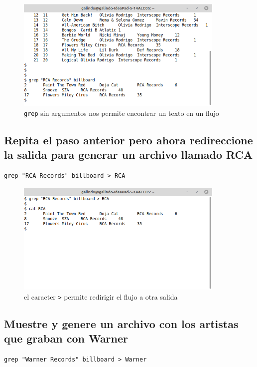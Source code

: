 \documentclass[11pt]{article}
\begin{document}
\begin{figure}[htbp]
\centering
\includegraphics[width=10cm]{img/2.png}
\caption[\texttt{grep}]{\texttt{grep} sin argumentos nos permite encontrar un texto en un flujo}
\end{figure}

\pagebreak

\subsection{Repita el paso anterior pero ahora redireccione la salida para generar un archivo llamado RCA}
\label{sec:orgbe7fde3}

\begin{verbatim}
grep "RCA Records" billboard > RCA
\end{verbatim}

\begin{figure}[htbp]
\centering
\includegraphics[width=10cm]{img/3.png}
\caption[\texttt{>}]{el caracter \texttt{>} permite redirigir el flujo a otra salida}
\end{figure}


\subsection{Muestre y genere un archivo con los artistas que graban con Warner}
\label{sec:org403140e}
\begin{verbatim}
grep "Warner Records" billboard > Warner
\end{verbatim}
\end{document}

